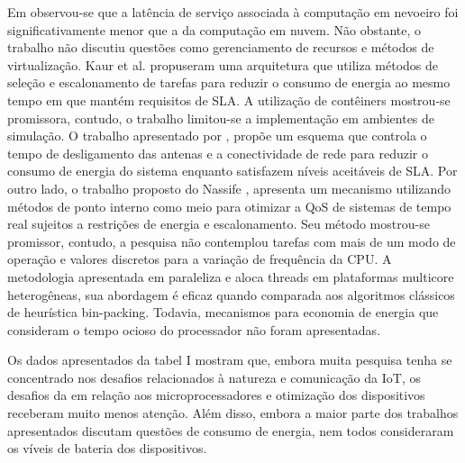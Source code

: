 Em \cite{sarkar2016theoretical} observou-se que a latência de serviço associada à computação em nevoeiro foi significativamente menor que a da computação em nuvem. Não obstante, o trabalho não discutiu questões como gerenciamento de recursos e métodos de virtualização. 
Kaur et al. \cite{kaur2017container} propuseram uma arquitetura que utiliza métodos de seleção e escalonamento de tarefas para reduzir o consumo de energia ao mesmo tempo em que mantém requisitos de SLA. A utilização de contêiners mostrou-se promissora, contudo, o trabalho limitou-se a implementação em ambientes de simulação.  O trabalho apresentado por \cite{suto2015energy},  propõe um esquema que controla o tempo de desligamento das antenas e a conectividade de rede para reduzir o consumo de energia do sistema enquanto satisfazem níveis aceitáveis de SLA. 
Por outro lado, o trabalho proposto do Nassife \cite{nassiffe2016optimising}, apresenta um mecanismo utilizando métodos de ponto interno como meio para otimizar a QoS de sistemas de tempo real sujeitos a restrições de energia e escalonamento. Seu método mostrou-se promissor, contudo, a pesquisa não contemplou tarefas com mais de um modo de operação e valores discretos para a variação de frequência da CPU. A metodologia apresentada em \cite{zahaf2017energy} paraleliza e aloca threads em plataformas multicore heterogêneas, sua abordagem é eficaz quando comparada aos algoritmos clássicos de heurística bin-packing. Todavia, mecanismos para economia de energia que consideram o tempo ocioso do processador não foram apresentadas. 
    
Os dados apresentados da tabel I mostram que, embora muita pesquisa tenha se concentrado nos desafios relacionados à natureza e comunicação da IoT, os desafios da em relação aos microprocessadores e otimização dos dispositivos receberam muito menos atenção. Além disso,  embora a maior parte dos trabalhos apresentados discutam questões de consumo de energia, nem todos consideraram os víveis de bateria dos dispositivos. 